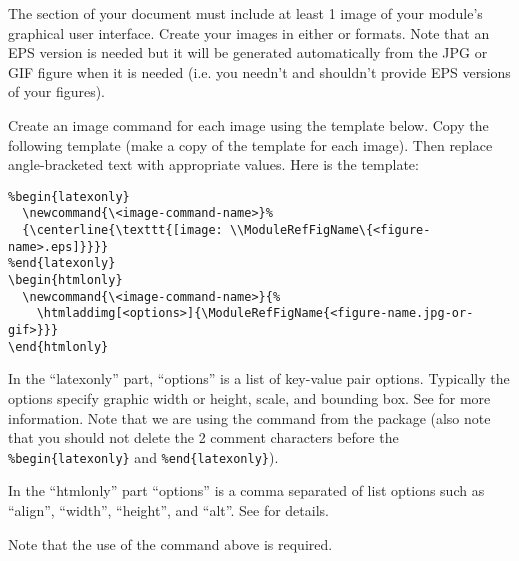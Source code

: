 \documentclass[11pt]{article}
\begin{document}
The  section of your document must include at least 1
image of your module's graphical user interface. Create your images in
either  or  formats.  Note that an EPS version
is needed but it will be generated automatically from the JPG or GIF figure
when it is needed (i.e. you needn't and shouldn't provide EPS versions of
your figures).

Create an image command for each image using the template below.  Copy the
following template (make a copy of the template for each image).  Then
replace angle-bracketed text with appropriate values.  Here is the template:

\begin{verbatim}
%begin{latexonly}
  \newcommand{\<image-command-name>}%
  {\centerline{\texttt{[image: \\ModuleRefFigName\{<figure-name>.eps]}}}}
%end{latexonly}
\begin{htmlonly}
  \newcommand{\<image-command-name>}{%
    \htmladdimg[<options>]{\ModuleRefFigName{<figure-name.jpg-or-gif>}}}
\end{htmlonly}
\end{verbatim}

\begin{rawhtml}
  <PRE>
  &#37begin{latexonly}
  \newcommand{\&lt;image-command-name&gt;}
  {\centerline{\texttt{[image: \\ModuleRefFigName\{\&lt;<figure-name>.eps\&gt;]}}}}
  &#37end{latexonly}
  &#92begin{htmlonly}
  \newcommand{\&lt;image-command-name&gt;}
  &nbsp&nbsp   {\htmladdimg[&lt;options&gt;]{\ModuleRefFigName{&lt;<figure-name.jpg-or-gif>&gt;}}}
  &#92end{htmlonly}
  </PRE>
\end{rawhtml}


In the ``latexonly'' part, ``options'' is a list of key-value pair options.
Typically the options specify graphic width or height, scale, and bounding
box.  See  for more information.  Note
that we are using the  command from the
 package (also note that you should not delete the 2
comment characters before the \verb|%begin{latexonly}| and
\verb|%end{latexonly}|). 

In the ``htmlonly'' part ``options'' is a comma separated of list options
such as ``align'', ``width'', ``height'', and ``alt''.  See  for details.

Note that the use of the  command above is
required.
\end{document}

